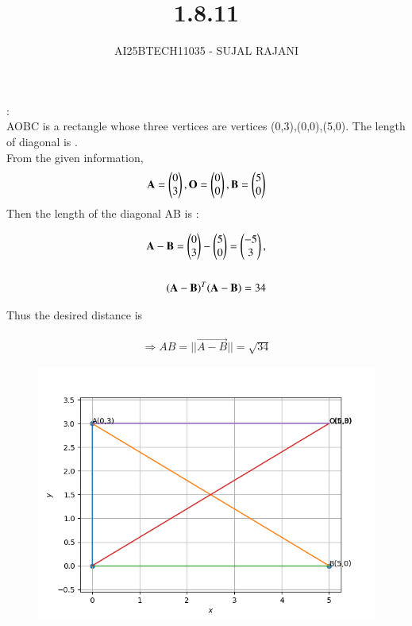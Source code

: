 \documentclass[journal,12pt,onecolumn]{IEEEtran}
\begin{document}
\title{1.8.11}
\author{AI25BTECH11035 - SUJAL RAJANI}
{\let\newpage\relax\maketitle}
{}:
\\
\noindent AOBC is a rectangle whose three vertices are vertices (0,3),(0,0),(5,0). The 
length of diagonal is \underline{\hspace{2cm}}.
\\
From the given information,
\begin{align}
			\mathbf{A} = \begin{pmatrix}0\\3\end{pmatrix},\mathbf{O} = \begin{pmatrix}0\\0\end{pmatrix},\mathbf{B} = \begin{pmatrix}5\\0\end{pmatrix} 
\end{align}
Then the length of the diagonal AB is :

\begin{align}
   \mathbf{ A-B}=\begin{pmatrix}0\\3\end{pmatrix}-\begin{pmatrix}5\\0\end{pmatrix}=\begin{pmatrix}-5\\3\end{pmatrix},
    \\
    \\
    \mathbf{(A-B)}^T\mathbf{(A-B)}=34
    \end{align}
    
    Thus the desired distance is
    
    \begin{align}
     \Rightarrow AB=||\vec{A-B}||=\sqrt{34}	 
    \end{align}
    
    \begin{figure}[H]
    \centering
    \includegraphics[width = 0.7\columnwidth]{figs/img.png}
    \caption*{}
    \label{figs}
\end{figure}
\end{document}
